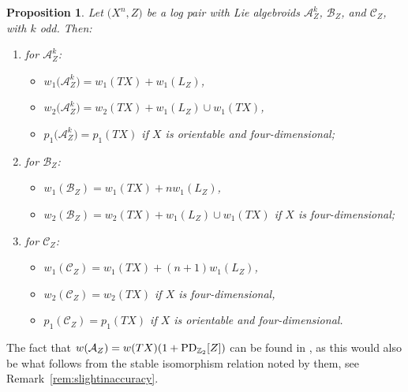 \documentclass[10pt,a4paper]{amsart}
\numberwithin{equation}{section}
\newtheorem{Proposition}[Theorem]{Proposition}
 { \theoremstyle{definition}
\newtheorem{Definition}[Theorem]{Definition}
\newtheorem{Example}[Theorem]{Example}
\newtheorem{Remark}[Theorem]{Remark} }
\begin{document}
\begin{Proposition}\label{prop:logcharclass} Let $\big(X^n,Z\big)$ be a log pair with Lie algebroids $\mathcal{A}_Z^k$, $\mathcal{B}_Z$, and $\mathcal{C}_Z$, with $k$ odd. Then:
\begin{enumerate}\itemsep=0pt
\item[] for $\mathcal{A}^k_Z$:
\begin{itemize}\itemsep=0pt
\item $w_1\big(\mathcal{A}^k_Z\big) = w_1(TX) + w_1(L_Z)$,
\item $w_2\big(\mathcal{A}^k_Z\big) = w_2(TX) + w_1(L_Z) \cup w_1(TX)$,
\item $p_1\big(\mathcal{A}^k_Z\big) = p_1(TX)$ if $X$ is orientable and four-dimensional;
\end{itemize}
\item[]	for $\mathcal{B}_Z$:
\begin{itemize}\itemsep=0pt
\item $w_1(\mathcal{B}_Z) = w_1(TX) + n w_1(L_Z)$,
\item $w_2(\mathcal{B}_Z) = w_2(TX) + w_1(L_Z) \cup w_1(TX)$ if $X$ is four-dimensional;
\end{itemize}
\item[]	for $\mathcal{C}_Z$:
\begin{itemize}\itemsep=0pt
\item $w_1(\mathcal{C}_Z) = w_1(TX) + (n+1) w_1(L_Z)$,
\item $w_2(\mathcal{C}_Z) = w_2(TX)$ if $X$ is four-dimensional,
\item $p_1(\mathcal{C}_Z) = p_1(TX)$ if $X$ is orientable and four-dimensional.
\end{itemize}
\end{enumerate}
\end{Proposition}

\begin{Remark} The fact that $w(\mathcal{A}_Z) = w(TX)(1 + {\rm PD}_{\mathbb{Z}_2}[Z])$ can be found in \cite{CannasDaSilvaGuilleminWoodward00}, as this would also be what follows from the stable isomorphism relation noted by them, see Remark~\ref{rem:slightinaccuracy}.
\end{Remark}
\end{document}
